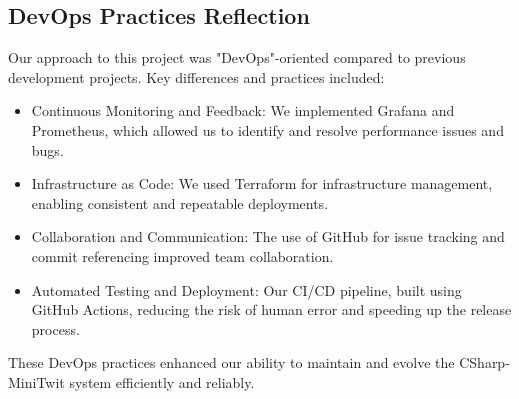\subsection{DevOps Practices Reflection}

Our approach to this project was "DevOps"-oriented compared to previous development projects. Key differences and practices included:
\begin{itemize}
    \item Continuous Monitoring and Feedback: We implemented Grafana and Prometheus, which allowed us to identify and resolve performance issues and bugs.
    \item Infrastructure as Code: We used Terraform for infrastructure management, enabling consistent and repeatable deployments.
    \item Collaboration and Communication: The use of GitHub for issue tracking and commit referencing improved team collaboration.
    \item Automated Testing and Deployment: Our CI/CD pipeline, built using GitHub Actions, reducing the risk of human error and speeding up the release process.
\end{itemize}

\noindent These DevOps practices enhanced our ability to maintain and evolve the CSharp-MiniTwit system efficiently and reliably.
